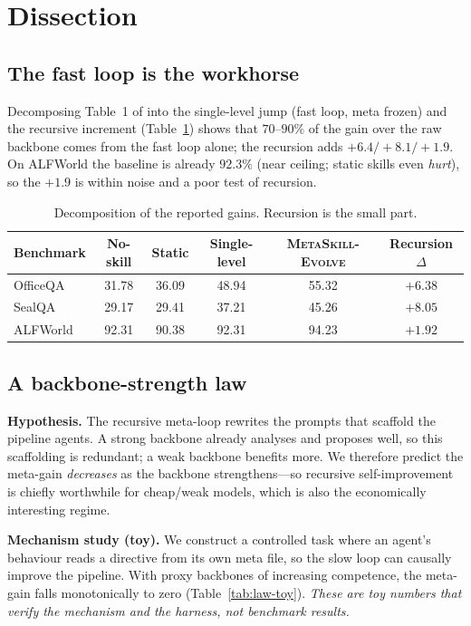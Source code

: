 \documentclass[11pt]{article}
\newcommand{\metaskill}{\textsc{MetaSkill-Evolve}}
\begin{document}
\section{Dissection}
\subsection{The fast loop is the workhorse}\label{sec:workhorse}
Decomposing Table~1 of \citet{wang2026metaskill} into the single-level jump (fast
loop, meta frozen) and the recursive increment (Table~\ref{tab:decomp}) shows that
$70$--$90\%$ of the gain over the raw backbone comes from the fast loop alone; the
recursion adds $+6.4/+8.1/+1.9$. On ALFWorld the baseline is already $92.3\%$
(near ceiling; static skills even \emph{hurt}), so the $+1.9$ is within noise and
a poor test of recursion.

\begin{table}[h]\centering
\caption{Decomposition of the reported gains. Recursion is the small part.}
\label{tab:decomp}
\begin{tabular}{lccccc}
\toprule
Benchmark & No-skill & Static & Single-level & \metaskill{} & Recursion $\Delta$\\
\midrule
OfficeQA & 31.78 & 36.09 & 48.94 & 55.32 & $+6.38$\\
SealQA   & 29.17 & 29.41 & 37.21 & 45.26 & $+8.05$\\
ALFWorld & 92.31 & 90.38 & 92.31 & 94.23 & $+1.92$\\
\bottomrule
\end{tabular}
\end{table}

\subsection{A backbone-strength law}\label{sec:law}
\textbf{Hypothesis.} The recursive meta-loop rewrites the prompts that scaffold
the pipeline agents. A strong backbone already analyses and proposes well, so this
scaffolding is redundant; a weak backbone benefits more. We therefore predict the
meta-gain \emph{decreases} as the backbone strengthens---so recursive
self-improvement is chiefly worthwhile for cheap/weak models, which is also the
economically interesting regime.

\textbf{Mechanism study (toy).} We construct a controlled task where an agent's
behaviour reads a directive from its own meta file, so the slow loop can causally
improve the pipeline. With proxy backbones of increasing competence, the meta-gain
falls monotonically to zero (Table~\ref{tab:law-toy}). \emph{These are toy numbers
that verify the mechanism and the harness, not benchmark results.}
\end{document}
